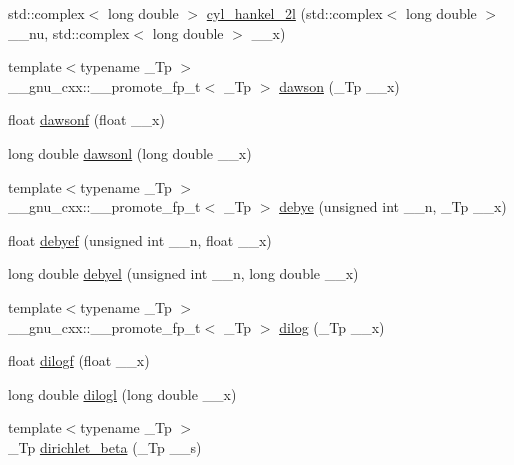 \begin{DoxyCompactItemize}
std\+::complex$<$ long double $>$ \hyperlink{group__gnu__math__spec__func_ga1ac6434925254bd02e108f5a4e52b34d}{cyl\+\_\+hankel\+\_\+2l} (std\+::complex$<$ long double $>$ \+\_\+\+\_\+nu, std\+::complex$<$ long double $>$ \+\_\+\+\_\+x)
\item 
{\footnotesize template$<$typename \+\_\+\+Tp $>$ }\\\+\_\+\+\_\+gnu\+\_\+cxx\+::\+\_\+\+\_\+promote\+\_\+fp\+\_\+t$<$ \+\_\+\+Tp $>$ \hyperlink{group__gnu__math__spec__func_ga0623ddcbfdce696781e19648fde6f33a}{dawson} (\+\_\+\+Tp \+\_\+\+\_\+x)
\item 
float \hyperlink{group__gnu__math__spec__func_ga0a1b8e6760b8c7869127d41d96209318}{dawsonf} (float \+\_\+\+\_\+x)
\item 
long double \hyperlink{group__gnu__math__spec__func_ga6647a7444ff9c7c1f2a8ed36761bfeb2}{dawsonl} (long double \+\_\+\+\_\+x)
\item 
{\footnotesize template$<$typename \+\_\+\+Tp $>$ }\\\+\_\+\+\_\+gnu\+\_\+cxx\+::\+\_\+\+\_\+promote\+\_\+fp\+\_\+t$<$ \+\_\+\+Tp $>$ \hyperlink{group__gnu__math__spec__func_ga4bd3029fcde3afdeee5f313b2ebc6b0d}{debye} (unsigned int \+\_\+\+\_\+n, \+\_\+\+Tp \+\_\+\+\_\+x)
\item 
float \hyperlink{group__gnu__math__spec__func_ga683d3a885913b52db128aa5d624984a4}{debyef} (unsigned int \+\_\+\+\_\+n, float \+\_\+\+\_\+x)
\item 
long double \hyperlink{group__gnu__math__spec__func_ga2db11e767b89bbd36be6ebfadda3401f}{debyel} (unsigned int \+\_\+\+\_\+n, long double \+\_\+\+\_\+x)
\item 
{\footnotesize template$<$typename \+\_\+\+Tp $>$ }\\\+\_\+\+\_\+gnu\+\_\+cxx\+::\+\_\+\+\_\+promote\+\_\+fp\+\_\+t$<$ \+\_\+\+Tp $>$ \hyperlink{group__gnu__math__spec__func_ga7a95a3cb9a53aca2a1ff9752ce9d5e3c}{dilog} (\+\_\+\+Tp \+\_\+\+\_\+x)
\item 
float \hyperlink{group__gnu__math__spec__func_ga901091e0e7ce7d6113ae6a86f4865a92}{dilogf} (float \+\_\+\+\_\+x)
\item 
long double \hyperlink{group__gnu__math__spec__func_gae90c13ee690ebaf10a18a900fe2646f9}{dilogl} (long double \+\_\+\+\_\+x)
\item 
{\footnotesize template$<$typename \+\_\+\+Tp $>$ }\\\+\_\+\+Tp \hyperlink{group__gnu__math__spec__func_ga87466a2d429a2815d794acc21c882b08}{dirichlet\+\_\+beta} (\+\_\+\+Tp \+\_\+\+\_\+s)
\item 

\end{DoxyCompactItemize}
